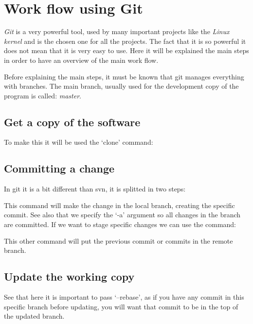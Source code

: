 
\chapter{Work flow using Git}

\emph{Git} is a very powerful tool, used by many important projects like the \emph{Linux kernel} and is the chosen one for all the \GNOME projects. The fact that it is so powerful it does not mean that it is very easy to use. Here it will be explained the main steps in order to have an overview of the main work flow.

Before explaining the main steps, it must be known that git manages everything with branches. The main branch, usually used for the development copy of the program is called: \emph{master}.

\section*{Get a copy of the software}

To make this it will be used the `clone' command:

\noindent{}

\section*{Committing a change}

In git it is a bit different than svn, it is splitted in two steps:

\noindent{}

This command will make the change in the local branch, creating the specific commit. See also that we specify the `-a' argument so all changes in the branch are committed. If we want to stage specific changes we can use the command:

\noindent{}

\noindent{}

This other command will put the previous commit or commits in the remote branch.

\section*{Update the working copy}

\noindent{}

See that here it is important to pass `--rebase', as if you have any commit in this specific branch before updating, you will want that commit to be in the top of the updated branch.

